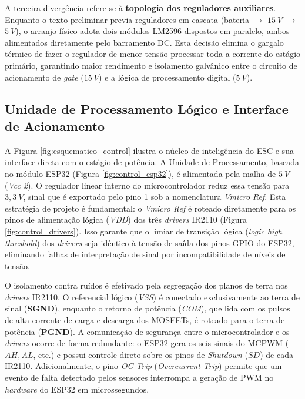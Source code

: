 A terceira divergência refere-se à \textbf{topologia dos reguladores auxiliares}. Enquanto o texto preliminar previa reguladores em cascata (bateria $\rightarrow$ $15 \: V$ $\rightarrow$ $5 \: V$), o arranjo físico adota dois módulos LM2596 dispostos em paralelo, ambos alimentados diretamente pelo barramento DC. Esta decisão elimina o gargalo térmico de fazer o regulador de menor tensão processar toda a corrente do estágio primário, garantindo maior rendimento e isolamento galvânico entre o circuito de acionamento de \textit{gate} ($15 \: V$) e a lógica de processamento digital ($5 \: V$).

\subsection{Unidade de Processamento Lógico e Interface de Acionamento}

A Figura \ref{fig:esquematico_control} ilustra o núcleo de inteligência do ESC e sua interface direta com o estágio de potência. A Unidade de Processamento, baseada no módulo ESP32 (Figura \ref{fig:control_esp32}), é alimentada pela malha de $5 \: V$ (\textit{Vcc 2}). O regulador linear interno do microcontrolador reduz essa tensão para $3,3 \: V$, sinal que é exportado pelo pino 1 sob a nomenclatura \textit{Vmicro Ref}. Esta estratégia de projeto é fundamental: o \textit{Vmicro Ref} é roteado diretamente para os pinos de alimentação lógica (\textit{VDD}) dos três \textit{drivers} IR2110 (Figura \ref{fig:control_drivers}). Isso garante que o limiar de transição lógica (\textit{logic high threshold}) dos \textit{drivers} seja idêntico à tensão de saída dos pinos GPIO do ESP32, eliminando falhas de interpretação de sinal por incompatibilidade de níveis de tensão.

O isolamento contra ruídos é efetivado pela segregação dos planos de terra nos \textit{drivers} IR2110. O referencial lógico (\textit{VSS}) é conectado exclusivamente ao terra de sinal (\textbf{SGND}), enquanto o retorno de potência (\textit{COM}), que lida com os pulsos de alta corrente de carga e descarga dos MOSFETs, é roteado para o terra de potência (\textbf{PGND}). A comunicação de segurança entre o microcontrolador e os \textit{drivers} ocorre de forma redundante: o ESP32 gera os seis sinais do MCPWM ($AH, AL$, etc.) e possui controle direto sobre os pinos de \textit{Shutdown} ($SD$) de cada IR2110. Adicionalmente, o pino \textit{OC Trip} (\textit{Overcurrent Trip}) permite que um evento de falta detectado pelos sensores interrompa a geração de PWM no \textit{hardware} do ESP32 em microssegundos.

